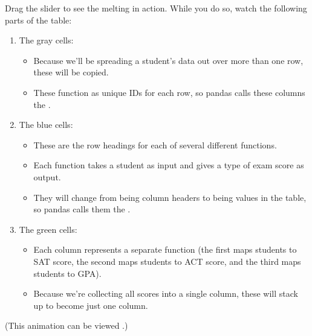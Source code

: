 \documentclass[letterpaper,10pt,english]{jupyterBook}
\begin{document}
\sphinxAtStartPar
Drag the slider to see the melting in action.  While you do so, watch the following parts of the table:
\begin{enumerate}
%
\item {} 
\sphinxAtStartPar
The gray cells:
\begin{itemize}
\item {} 
\sphinxAtStartPar
Because we’ll be spreading a student’s data out over more than one row, these will be copied.

\item {} 
\sphinxAtStartPar
These function as unique IDs for each row, so pandas calls these columns the .

\end{itemize}

\item {} 
\sphinxAtStartPar
The blue cells:
\begin{itemize}
\item {} 
\sphinxAtStartPar
These are the row headings for each of several different functions.

\item {} 
\sphinxAtStartPar
Each function takes a student as input and gives a type of exam score as output.

\item {} 
\sphinxAtStartPar
They will change from being column headers to being values in the table, so pandas calls them the .

\end{itemize}

\item {} 
\sphinxAtStartPar
The green cells:
\begin{itemize}
\item {} 
\sphinxAtStartPar
Each column represents a separate function (the first maps students to SAT score, the second maps students to ACT score, and the third maps students to GPA).

\item {} 
\sphinxAtStartPar
Because we’re collecting all scores into a single column, these will stack up to become just one column.

\end{itemize}

\end{enumerate}

\sphinxAtStartPar
(This animation can be viewed .)
\end{document}
